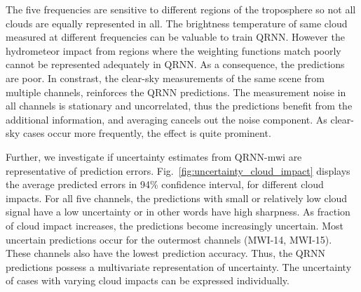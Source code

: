 \documentclass[amt, manuscript]{copernicus}
\begin{document}
The five frequencies are sensitive to different regions of the troposphere so not all clouds are equally represented in all. The brightness temperature of same cloud measured at different frequencies can be valuable to train QRNN. However the hydrometeor impact from regions where the weighting functions match poorly cannot be represented adequately in QRNN. As a consequence, the predictions are poor. In constrast, the clear-sky measurements of the same scene from multiple channels, reinforces the QRNN predictions. The measurement noise in all channels is stationary and uncorrelated, thus the predictions benefit from the additional information, and averaging cancels out the noise component. As clear-sky cases occur more frequently, the effect is quite prominent.

Further, we investigate if uncertainty estimates from QRNN-mwi are representative of prediction errors. Fig.~\ref{fig:uncertainty_cloud_impact} displays the average predicted errors in 94\% confidence interval, for different cloud impacts. For all five channels, the predictions with small or relatively low cloud signal have a low uncertainty or in other words have high sharpness. As fraction of cloud impact increases, the predictions become increasingly uncertain. Most uncertain predictions occur for the outermost channels (MWI-14, MWI-15). These channels also have the lowest prediction accuracy.  Thus, the QRNN predictions possess a multivariate representation of uncertainty. The uncertainty of cases with varying cloud impacts can be expressed individually.
\end{document}
